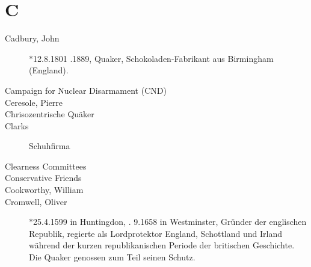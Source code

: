 \section*{C}

\articlesize

\begin{description}

 \item[Cadbury, John] $\ast$12.8.1801 .1889, Quaker, Schokoladen-Fabrikant aus Birmingham (England).

 \item[Campaign for Nuclear Disarmament (CND)]

 \item[Ceresole, Pierre]

 \item[Chrisozentrische Quäker]

 \item[Clarks] Schuhfirma
 
 \item[Clearness Committees]


 \item[Conservative Friends]

 \item[Cookworthy, William]

 \item[Cromwell, Oliver] $\ast$25.4.1599 in Huntingdon, . 9.1658 in Westminster, Gründer der englischen Republik, regierte als Lordprotektor England, Schottland und Irland während der kurzen republikanischen Periode der britischen Geschichte. Die Quaker genossen zum Teil seinen Schutz.

 \end{description}

\normalsize